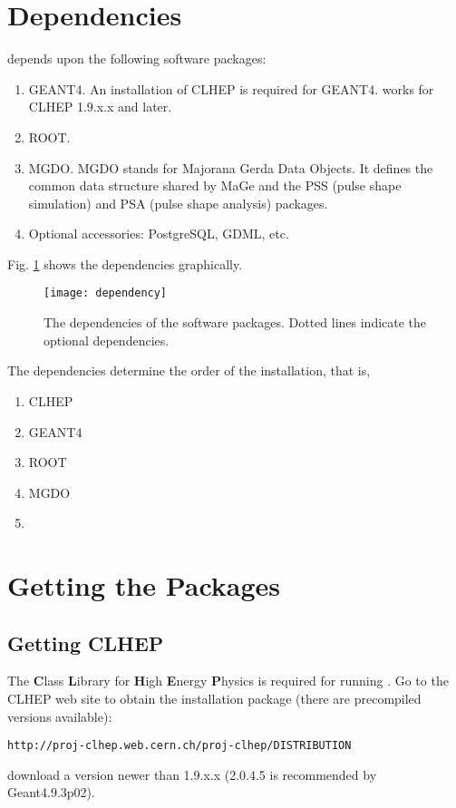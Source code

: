 
\section{Dependencies}
\mage depends upon the following software packages:
\begin{enumerate}
\item {} GEANT4. An installation of CLHEP is required for
  GEANT4. \mage works for CLHEP 1.9.x.x and later.
\item {} ROOT.
\item {} MGDO. MGDO stands for Majorana Gerda Data
  Objects. It defines the common data structure shared by MaGe and the
  PSS (pulse shape simulation) and PSA (pulse shape analysis)
  packages.
\item {} Optional accessories: PostgreSQL, GDML, etc.
\end{enumerate}
Fig. \ref{fig:dep} shows the dependencies graphically.

\begin{figure}[htbp]
  \centering
  \texttt{[image: dependency]}
  \caption{The dependencies of the software packages. Dotted lines
    indicate the optional dependencies.}
  \label{fig:dep}
\end{figure}

The dependencies determine the order of the installation, that is,
\begin{enumerate}
\item CLHEP
\item GEANT4
\item ROOT
\item MGDO
\item \mage
\end{enumerate}

\section{Getting the Packages}

\subsection{Getting CLHEP}
The \textbf{C}lass \textbf{L}ibrary for \textbf{H}igh \textbf{E}nergy \textbf{P}hysics is required for running \geant.
Go to the CLHEP web site to obtain the installation package (there are precompiled versions available):
\begin{lstlisting}
http://proj-clhep.web.cern.ch/proj-clhep/DISTRIBUTION
\end{lstlisting}
download a version newer than 1.9.x.x (2.0.4.5 is recommended by Geant4.9.3p02).

